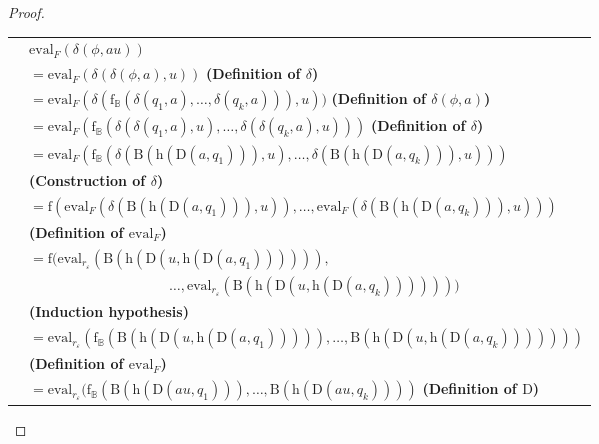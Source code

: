 \documentclass{article}
\begin{document}
\begin{proof}
\begin{enumerate}
              \begin{tabular}{l@{\ }l}
                & $\mathrm{eval}_{F}(\delta(\phi,au))$\\
                & $=\mathrm{eval}_{F}(\delta(\delta(\phi,a),u))$ \hfill\textbf{(Definition of $\delta$)}\\
                & $=\mathrm{eval}_{F}(\delta(\mathrm{f}_{\mathbb{B}}(\delta(q_1,a),\ldots,\delta(q_k,a))),u))$ \hfill\textbf{(Definition of $\delta(\phi,a)$)}\\
                & $=\mathrm{eval}_{F}(\mathrm{f}_{\mathbb{B}}(\delta(\delta(q_1,a),u),\ldots,\delta(\delta(q_k,a),u)))$ \hfill\textbf{(Definition of $\delta$)}\\
                & $=\mathrm{eval}_{F}(\mathrm{f}_{\mathbb{B}}(\delta(\mathrm{B}(\mathrm{h}(\mathrm{D}(a,q_1))),u),\ldots,\delta(\mathrm{B}(\mathrm{h}(\mathrm{D}(a,q_k))),u)))$\\ & \hfill\textbf{(Construction of $\delta$)}\\
                & $=\mathrm{f}(\mathrm{eval}_{F}(\delta(\mathrm{B}(\mathrm{h}(\mathrm{D}(a,q_1))),u)),\ldots,\mathrm{eval}_{F}(\delta(\mathrm{B}(\mathrm{h}(\mathrm{D}(a,q_k))),u)))$ \\ & \hfill\textbf{(Definition of $\mathrm{eval}_F$)}\\
                & $=\mathrm{f}(\mathrm{eval}_{r_{\varepsilon}}(\mathrm{B}(\mathrm{h}(\mathrm{D}(u,\mathrm{h}(\mathrm{D}(a,q_1)))))),$\\
                &\ \ \ \ \ \ \ \ \ \ \ \ \ \ \ \ \ \ \ \ $\ldots,\mathrm{eval}_{r_{\varepsilon}}(\mathrm{B}(\mathrm{h}(\mathrm{D}(u,\mathrm{h}(\mathrm{D}(a,q_k)))))))$\\ &  \hfill\textbf{(Induction hypothesis)}\\
                & $=\mathrm{eval}_{r_{\varepsilon}}(\mathrm{f}_{\mathbb{B}}(\mathrm{B}(\mathrm{h}(\mathrm{D}(u,\mathrm{h}(\mathrm{D}(a,q_1))))),\ldots,\mathrm{B}(\mathrm{h}(\mathrm{D}(u,\mathrm{h}(\mathrm{D}(a,q_k)))))))$\\ &  \hfill\textbf{(Definition of $\mathrm{eval}_F$)}\\
                & $=\mathrm{eval}_{r_{\varepsilon}}(\mathrm{f}_{\mathbb{B}}(\mathrm{B}(\mathrm{h}(\mathrm{D}(au,q_1))),\ldots,\mathrm{B}(\mathrm{h}(\mathrm{D}(au,q_k))))$ \hfill\textbf{(Definition of $\mathrm{D}$)}\\
              \end{tabular}
        \end{enumerate}
        

\end{proof}
\end{document}
